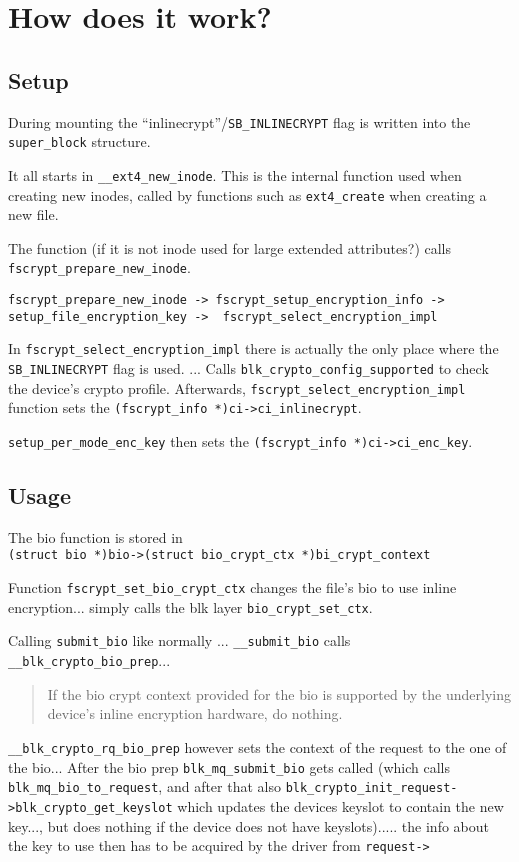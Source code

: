 \documentclass[
  digital, %
  oneside, %
  nolof,     %
  nolot,     %
]{fithesis4}
\begin{document}
\section{How does it work?}

\subsection{Setup}

During mounting the ``inlinecrypt''/\verb|SB_INLINECRYPT|  flag is written into the \verb|super_block| structure.

It all starts in \verb|__ext4_new_inode|. This is the internal function used when creating new inodes, called by functions such as \verb|ext4_create| when creating a new file.

The function (if it is not inode used for large extended attributes?) calls \verb|fscrypt_prepare_new_inode|.

\verb|fscrypt_prepare_new_inode -> fscrypt_setup_encryption_info ->| \verb|setup_file_encryption_key ->  fscrypt_select_encryption_impl|

In \verb|fscrypt_select_encryption_impl| there is actually the only place where the \verb|SB_INLINECRYPT| flag is used.
... Calls \verb|blk_crypto_config_supported| to check the device's crypto profile.
Afterwards, \verb|fscrypt_select_encryption_impl| function sets the \verb|(fscrypt_info *)ci->ci_inlinecrypt|.

\verb|setup_per_mode_enc_key| then sets the \verb|(fscrypt_info *)ci->ci_enc_key|.

\subsection{Usage}

The bio function is stored in \\ \verb|(struct bio *)bio->(struct bio_crypt_ctx *)bi_crypt_context|

Function \verb|fscrypt_set_bio_crypt_ctx| changes the file's bio to use inline encryption... simply calls the blk layer \verb|bio_crypt_set_ctx|.

Calling \verb|submit_bio| like normally ... \verb|__submit_bio| calls \verb|__blk_crypto_bio_prep|...

\blockquote{If the bio crypt context provided for the bio is supported by the underlying device's inline encryption hardware, do nothing.}

\verb|__blk_crypto_rq_bio_prep| however sets the context of the request to the one of the bio... 
After the bio prep  \verb|blk_mq_submit_bio| gets called (which calls \verb|blk_mq_bio_to_request|, and after that also \verb|blk_crypto_init_request->blk_crypto_get_keyslot| which updates the devices keyslot to contain the new key..., but does nothing if the device does not have keyslots)..... the info about the key to use then has to be acquired by the driver from \verb|request->|
\end{document}
